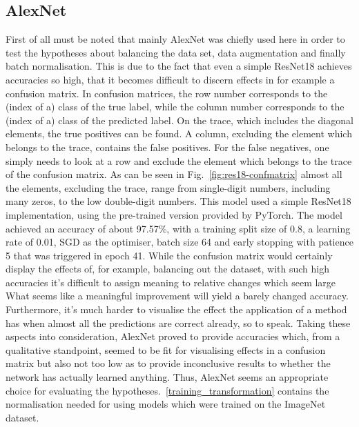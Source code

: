 \subsection{AlexNet}\label{resultsAlexNet}
First of all must be noted that mainly AlexNet was chiefly used here in order to test the hypotheses about balancing the data set, data augmentation and finally batch normalisation. This is due to the fact that even a simple ResNet18 achieves accuracies so high, that it becomes difficult to discern effects in for example a confusion matrix. In confusion matrices, the row number corresponds to the (index of a) class of the true label, while the column number corresponds to the (index of a) class of the predicted label. On the trace, which includes the diagonal elements, the true positives can be found. A column, excluding the element which belongs to the trace, contains the false positives. For the false negatives, one simply needs to look at a row and exclude the element which belongs to the trace of the confusion matrix. As can be seen in Fig.~\ref{fig:res18-confmatrix} almost all the elements, excluding the trace, range from single-digit numbers, including many zeros, to the low double-digit numbers. This model used a simple ResNet18 implementation, using the pre-trained version provided by PyTorch. The model achieved an accuracy of about 97.57\%, with a training split size of 0.8, a learning rate of 0.01, SGD as the optimiser, batch size 64 and early stopping with patience 5 that was triggered in epoch 41. While the confusion matrix would certainly display the effects of, for example, balancing out the dataset, with such high accuracies it's difficult to assign meaning to relative changes which seem large What seems like a meaningful improvement will yield a barely changed accuracy. Furthermore, it's much harder to visualise the effect the application of a method has when almost all the predictions are correct already, so to speak. Taking these aspects into consideration, AlexNet proved to provide accuracies which, from a qualitative standpoint, seemed to be fit for visualising effects in a confusion matrix but also not too low as to provide inconclusive results to whether the network has actually learned anything. Thus, AlexNet seems an appropriate choice for evaluating the hypotheses.~\ref{training_transformation} contains the normalisation needed for using models which were trained on the ImageNet dataset.

